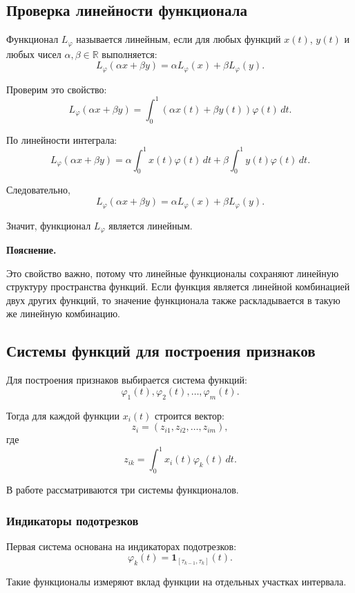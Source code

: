 \documentclass[14pt,a4paper]{extarticle}
\newenvironment{explanation}
{
    \vspace{0.2cm}
    \noindent\textbf{Пояснение.}
}
{
    \vspace{0.2cm}
}
\begin{document}
\subsection{Проверка линейности функционала}

Функционал \(L_{\varphi}\) называется линейным, если для любых функций \(x(t)\), \(y(t)\) и любых чисел \(\alpha,\beta \in \mathbb{R}\) выполняется:
\[
L_{\varphi}(\alpha x+\beta y)
=
\alpha L_{\varphi}(x)+\beta L_{\varphi}(y).
\]

Проверим это свойство:
\[
L_{\varphi}(\alpha x+\beta y)
=
\int_0^1(\alpha x(t)+\beta y(t))\varphi(t)\,dt.
\]

По линейности интеграла:
\[
L_{\varphi}(\alpha x+\beta y)
=
\alpha\int_0^1x(t)\varphi(t)\,dt
+
\beta\int_0^1y(t)\varphi(t)\,dt.
\]

Следовательно,
\[
L_{\varphi}(\alpha x+\beta y)
=
\alpha L_{\varphi}(x)+\beta L_{\varphi}(y).
\]

Значит, функционал \(L_{\varphi}\) является линейным.

\begin{explanation}
Это свойство важно, потому что линейные функционалы сохраняют линейную структуру пространства функций. Если функция является линейной комбинацией двух других функций, то значение функционала также раскладывается в такую же линейную комбинацию.
\end{explanation}

\subsection{Системы функций для построения признаков}

Для построения признаков выбирается система функций:
\[
\varphi_1(t),\varphi_2(t),\dots,\varphi_m(t).
\]

Тогда для каждой функции \(x_i(t)\) строится вектор:
\[
z_i=(z_{i1},z_{i2},\dots,z_{im}),
\]
где
\[
z_{ik}=\int_0^1 x_i(t)\varphi_k(t)\,dt.
\]

В работе рассматриваются три системы функционалов.

\subsubsection{Индикаторы подотрезков}

Первая система основана на индикаторах подотрезков:
\[
\varphi_k(t)=\mathbf{1}_{[\tau_{k-1},\tau_k]}(t).
\]

Такие функционалы измеряют вклад функции на отдельных участках интервала.
\end{document}
